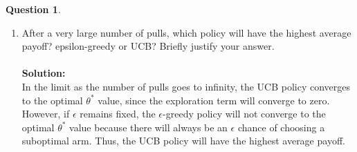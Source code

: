 \documentclass{article}
\theoremstyle{definition}
\newtheorem{question}[thm]{Question}
\begin{document}
\begin{question}
\begin{enumerate}[label=(\alph*)]
        \item After a very large number of pulls, which policy will have the highest average payoff? epsilon-greedy or UCB? Briefly justify your answer.
        \\ \\ \noindent \textbf{Solution: }\\
        In the limit as the number of pulls goes to infinity, the UCB policy converges to the optimal $\theta^*$ value, since the exploration term will converge to zero. However, if $\epsilon$ remains fixed, the $\epsilon$-greedy policy will not converge to the optimal $\theta^*$ value because there will always be an $\epsilon$ chance of choosing a suboptimal arm. Thus, the UCB policy will have the highest average payoff.
    \end{enumerate}
\end{question}

\clearpage
\end{document}
